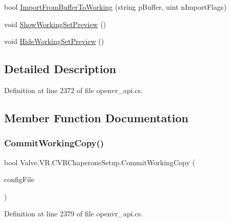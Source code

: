 \begin{DoxyCompactItemize}
\item 
bool \mbox{\hyperlink{class_valve_1_1_v_r_1_1_c_v_r_chaperone_setup_ad926c2713b34a03cc1f6c9ab8f0bcf79}{Import\+From\+Buffer\+To\+Working}} (string p\+Buffer, uint n\+Import\+Flags)
\item 
void \mbox{\hyperlink{class_valve_1_1_v_r_1_1_c_v_r_chaperone_setup_a2bc2d7e52176af8cf8cef21fc309c46e}{Show\+Working\+Set\+Preview}} ()
\item 
void \mbox{\hyperlink{class_valve_1_1_v_r_1_1_c_v_r_chaperone_setup_aa648b650438df3c243c3a6ada856ce7d}{Hide\+Working\+Set\+Preview}} ()
\end{DoxyCompactItemize}


\subsection{Detailed Description}


Definition at line 2372 of file openvr\+\_\+api.\+cs.



\subsection{Member Function Documentation}
\mbox{\label{class_valve_1_1_v_r_1_1_c_v_r_chaperone_setup_abb6ee2add41e2ffd400ab355774c7386}} 
\subsubsection{\texorpdfstring{CommitWorkingCopy()}{CommitWorkingCopy()}}
{\footnotesize\ttfamily bool Valve.\+V\+R.\+C\+V\+R\+Chaperone\+Setup.\+Commit\+Working\+Copy (\begin{DoxyParamCaption}\item[{\mbox{\hyperlink{namespace_valve_1_1_v_r_a9d16676419221d1177d39fe862e1f7d1}{E\+Chaperone\+Config\+File}}}]{config\+File }\end{DoxyParamCaption})}



Definition at line 2379 of file openvr\+\_\+api.\+cs.

\mbox{\label{class_valve_1_1_v_r_1_1_c_v_r_chaperone_setup_a0b2f938528a082e00bb40b8bf214a854}} 
